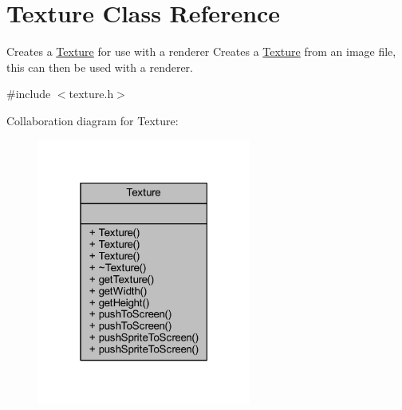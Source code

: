 \hypertarget{class_texture}{\section{Texture Class Reference}
\label{class_texture}
}


Creates a \hyperlink{class_texture}{Texture} for use with a renderer Creates a \hyperlink{class_texture}{Texture} from an image file, this can then be used with a renderer.  




{\ttfamily \#include $<$texture.\+h$>$}



Collaboration diagram for Texture\+:
\nopagebreak
\begin{figure}[H]
\begin{center}
\leavevmode
\includegraphics[width=199pt]{class_texture__coll__graph}
\end{center}
\end{figure}
